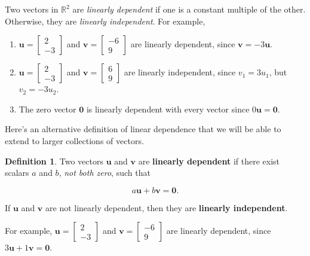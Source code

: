 \documentclass[
]{book}
\theoremstyle{definition}
\newtheorem{definition}{Definition}[chapter]
\theoremstyle{definition}
\theoremstyle{definition}
\theoremstyle{definition}
\theoremstyle{remark}
\begin{document}
Two vectors in \(\mathbb{R}^2\) are \emph{linearly dependent} if one is a constant multiple of the other. Otherwise, they are \emph{linearly independent}. For example,

\begin{enumerate}
\def\labelenumi{\arabic{enumi}.}
\item
  \(\mathbf{u}=\begin{bmatrix}2\\-3\end{bmatrix}\) and \(\mathbf{v}=\begin{bmatrix}-6\\9\end{bmatrix}\) are linearly dependent, since \(\mathbf{v}=-3\mathbf{u}\).
\item
  \(\mathbf{u}=\begin{bmatrix}2\\-3\end{bmatrix}\) and \(\mathbf{v}=\begin{bmatrix}6\\9\end{bmatrix}\) are linearly independent, since \(v_1=3u_1\), but \(v_2=-3u_2\).
\item
  The zero vector \(\mathbf{0}\) is linearly dependent with every vector since \(0\mathbf{u}=\mathbf{0}\).
\end{enumerate}

Here's an alternative definition of linear dependence that we will be able to extend to larger collections of vectors.

\begin{defbox}

\begin{definition}
\protect\hypertarget{def:linind}{}\label{def:linind}Two vectors \(\mathbf{u}\) and \(\mathbf{v}\) are \textbf{linearly dependent} if there exist scalars \(a\) and \(b\), \emph{not both zero}, such that

\[a\mathbf{u}+b\mathbf{v}=\mathbf{0}.\]

If \(\mathbf{u}\) and \(\mathbf{v}\) are not linearly dependent, then they are \textbf{linearly independent}.
\end{definition}

\end{defbox}

For example, \(\mathbf{u}=\begin{bmatrix}2\\-3\end{bmatrix}\) and \(\mathbf{v}=\begin{bmatrix}-6\\9\end{bmatrix}\) are linearly dependent, since \(3\mathbf{u}+1\mathbf{v}=\mathbf{0}.\)
\end{document}
